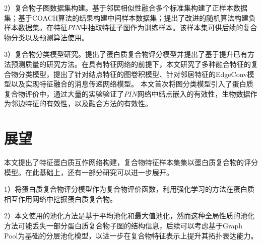 2）复合物子图数据集构建。基于邻居相似性融合多个标准集构建了正样本数据集；基于COACH算法的结果构建中间样本数据集；提出了改进的随机算法构建负样本数据集。在特征$PIN$中抽取特征子图作为训练样本。该样本集可供后续的复合物分类以及预测算法使用。

3）复合物分类模型研究。提出了蛋白质复合物评分模型并提出了基于提升已有方法预测质量的研究方法。在具有特征网络的前提下，本文研究了多种融合特征的复合物分类模型，提出了针对结点特征的图卷积模型、针对邻居特征的EdgeConv模型以及实现特征融合的消息传递网络模型。
本文首次将图分类模型引入了蛋白质复合物评价中，通过大量的实验验证了$PIN$网络中结点嵌入的有效性，生物数据作为邻边特征的有效性，以及融合方法的有效性。



\section{展望}
\label{section:forward}

本文提出了特征蛋白质互作网络构建，复合物特征样本集集以蛋白质复合物的评分模型。在此基础上，还有一部分研究可以进一步展开。

1）将蛋白质复合物评分模型作为复合物评价函数，利用强化学习的方法在蛋白质相互作用网络中挖掘蛋白质复合物。

2）本文使用的池化方法是基于平均池化和最大值池化，然而这种全局性质的池化方法可能丢失一部分蛋白质复合物子图的结构信息，后续可以考虑基于Graph Pool为基础的分层池化模型，以进一步在复合物特征表示上提升其拓扑表达能力。

